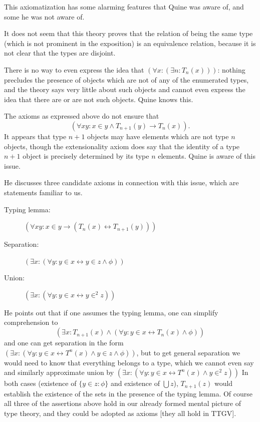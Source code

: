 \documentclass[12pt]{article}
\begin{document}
This axiomatization has some alarming features that Quine was aware of, and some he was not aware of.

It does not seem that this theory proves that the relation of being the same type (which is not prominent in the  exposition) is an equivalence relation, because it is not clear that the types are disjoint. 

There is no way to even express the idea that $(\forall x:(\exists n:T_n(x)))$:  nothing precludes the presence of objects which are not of any of the enumerated types, and the theory says very little about such objects and cannot even express the idea that there are or are not such objects.  Quine knows this.

The axioms as expressed above do not ensure that $$(\forall xy:x \in y \wedge T_{n+1}(y) \rightarrow T_n(x)).$$  It appears that type $n+1$ objects may have elements which are not type $n$ objects, though the extensionality axiom does say that the identity of a type $n+1$ object is precisely determined by its type $n$ elements.   Quine is aware of this issue.



He discusses three candidate axioms in connection with this issue, which are statements familiar to us.

\begin{description}

\item[Typing lemma:]  $(\forall xy:  x \in y \rightarrow (T_n(x) \leftrightarrow T_{n+1}(y)))$

\item[Separation:]  $(\exists x:(\forall y:y \in x \leftrightarrow y \in z \wedge \phi))$

\item[Union:]  $(\exists x:(\forall y:y \in x \leftrightarrow y \in ^2 z))$

\end{description}

He points out that if one assumes the typing lemma, one can simplify comprehension to
$$(\exists x:T_{n+1}(x) \wedge (\forall y:y \in x \leftrightarrow T_n(x) \wedge \phi))$$  and one can get separation
in the form $(\exists x:(\forall y:y \in x \leftrightarrow T^n(x) \wedge y \in z \wedge \phi))$, but to get general separation we would need to know that everything belongs to a type, which we cannot even say and similarly approximate union by  $(\exists x:(\forall y:y \in x \leftrightarrow T^n(x) \wedge y \in ^2 z))$  In both cases
(existence of $\{y \in z:\phi\}$ and existence of $\bigcup z$), $T_{n+1}(z)$ would establish the existence of the sets in the presence of the typing lemma.  Of course all three of the assertions above hold in our already formed mental picture of type theory, and they could be adopted as axioms [they all hold in TTGV].
\end{document}
